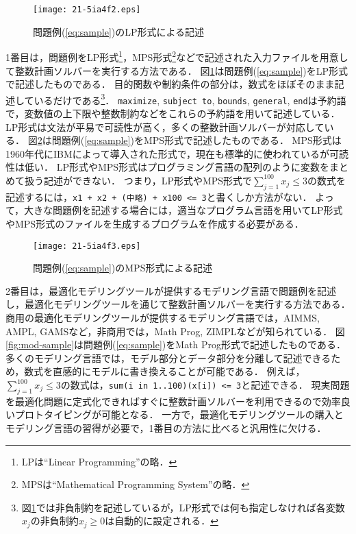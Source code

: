 \documentclass[japanese]{jnlp_1.4}
\begin{document}
\begin{figure}[b]
\begin{center}
\texttt{[image: 21-5ia4f2.eps]}
\end{center}
\caption{問題例(\ref{eq:sample})のLP形式による記述}
\label{fig:lp-sample}
\end{figure}

1番目は，問題例をLP形式\footnote{LPは``Linear Programming''の略．}，MPS形式\footnote{MPSは``Mathematical Programming System''の略．}などで記述された入力ファイルを用意して整数計画ソルバーを実行する方法である．
図\ref{fig:lp-sample}は問題例(\ref{eq:sample})をLP形式で記述したものである．
目的関数や制約条件の部分は，数式をほぼそのまま記述しているだけである\footnote{図\ref{fig:lp-sample}では非負制約を記述しているが，LP形式では何も指定しなければ各変数$x_j$の非負制約$x_j \ge 0$は自動的に設定される．}．
\texttt{maximize}, \texttt{subject to}, \texttt{bounds}, \texttt{general}, \texttt{end}は予約語で，変数値の上下限や整数制約などをこれらの予約語を用いて記述している．
LP形式は文法が平易で可読性が高く，多くの整数計画ソルバーが対応している．
図\ref{fig:mps-sample}は問題例(\ref{eq:sample})をMPS形式で記述したものである．
MPS形式は1960年代にIBMによって導入された形式で，現在も標準的に使われているが可読性は低い．
LP形式やMPS形式はプログラミング言語の配列のように変数をまとめて扱う記述ができない．
つまり，LP形式やMPS形式で$\sum_{j=1}^{100} x_j \le 3$の数式を記述するには，\texttt{x1 + x2 + (中略) + x100 <= 3}と書くしか方法がない．
よって，大きな問題例を記述する場合には，適当なプログラム言語を用いてLP形式やMPS形式のファイルを生成するプログラムを作成する必要がある．

\begin{figure}[t]
\begin{center}
\texttt{[image: 21-5ia4f3.eps]}
\end{center}
\caption{問題例(\ref{eq:sample})のMPS形式による記述}
\label{fig:mps-sample}
\end{figure}

2番目は，最適化モデリングツールが提供するモデリング言語で問題例を記述し，最適化モデリングツールを通じて整数計画ソルバーを実行する方法である．
商用の最適化モデリングツールが提供するモデリング言語では，AIMMS, AMPL, GAMSなど，非商用では，Math Prog, ZIMPLなどが知られている．
図\ref{fig:mod-sample}は問題例(\ref{eq:sample})をMath Prog形式で記述したものである．
多くのモデリング言語では，モデル部分とデータ部分を分離して記述できるため，数式を直感的にモデルに書き換えることが可能である．
例えば，$\sum_{j=1}^{100} x_j \le 3$の数式は，\texttt{sum(i in 1..100)(x[i]) <= 3}と記述できる．
現実問題を最適化問題に定式化できればすぐに整数計画ソルバーを利用できるので効率良いプロトタイピングが可能となる．
一方で，最適化モデリングツールの購入とモデリング言語の習得が必要で，1番目の方法に比べると汎用性に欠ける．
\end{document}

